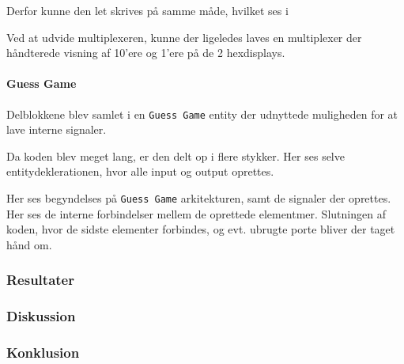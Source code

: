 {Derfor kunne den let skrives på samme måde, hvilket ses i 

Ved at udvide multiplexeren, kunne der ligeledes laves en multiplexer der håndterede visning af 10'ere og 1'ere på de 2 hexdisplays.

\paragraph{Guess Game}
Delblokkene blev samlet i en \texttt{Guess Game} entity der udnyttede muligheden for at lave interne signaler.


Da koden blev meget lang, er den delt op i flere stykker.
Her ses selve entitydeklerationen, hvor alle input og output oprettes.

Her ses begyndelses på \texttt{Guess Game} arkitekturen, samt de signaler der oprettes.
Her ses de interne forbindelser mellem de oprettede elementmer.
Slutningen af koden, hvor de sidste elementer forbindes, og evt. ubrugte porte bliver der taget hånd om.



\subsubsection{Resultater}

\subsubsection{Diskussion}
\subsubsection{Konklusion}
}